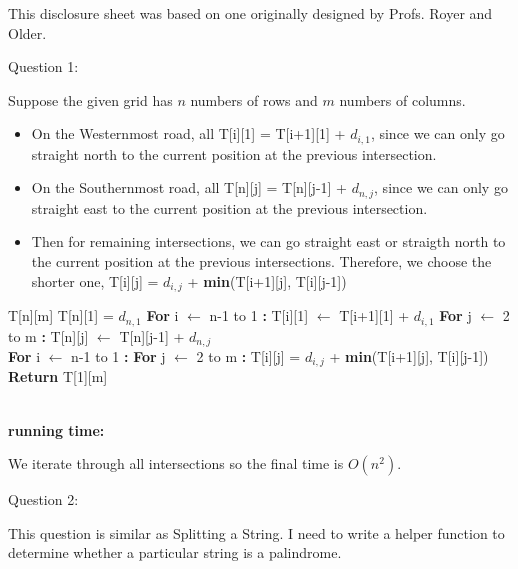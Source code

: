 \documentclass[12pt]{article}
\begin{document}

\hfill {\tiny This disclosure sheet was based on one originally designed
  by
  Profs. Royer and Older.}


\pagebreak
\noindent
\large Question 1: \vspace{5mm} \par
\normalsize 
Suppose the given grid has $n$ numbers of rows and $m$ numbers of columns. 
\begin{itemize}
  \item On the Westernmost road, all T[i][1] = T[i+1][1] + $d_{i,1}$, 
	since we can only go straight north to the current position at the previous intersection.
  \item	On the Southernmost road, all T[n][j] = T[n][j-1] + $d_{n,j}$,
	since we can only go straight east to the current position at the previous intersection.
  \item Then for remaining intersections, we can go straight east or straigth north to the current position at the previous intersections.
	Therefore, we choose the shorter one, T[i][j] = $d_{i,j}$ + \textbf{min}(T[i+1][j], T[i][j-1])
\end{itemize}

\begin{algorithm}
\begin{algorithmic}
\State T[n][m]
\State T[n][1] = $d_{n,1}$
\State \textbf{For} i $\leftarrow$ n-1 to 1 \textbf{:}
\State \hspace{0.4cm} T[i][1] $\leftarrow$ T[i+1][1] + $d_{i,1}$
\State \textbf{For} j $\leftarrow$ 2 to m \textbf{:}
\State \hspace{0.4cm} T[n][j] $\leftarrow$ T[n][j-1] + $d_{n,j}$
\\
\State \textbf{For} i $\leftarrow$ n-1 to 1 \textbf{:}
\State \hspace{0.4cm} \textbf{For} j $\leftarrow$ 2 to m \textbf{:}
\State \hspace{0.8cm} T[i][j] = $d_{i,j}$ + \textbf{min}(T[i+1][j], T[i][j-1])
\\
\State \textbf{Return} T[1][m] 
\end{algorithmic}
\end{algorithm}
\noindent \\
\textbf{running time:} \par
We iterate through all intersections so the final time is $O(n^2)$.



\pagebreak
\noindent
\large Question 2: \vspace{5mm} \par
\normalsize 
This question is similar as Splitting a String.
I need to write a helper function to determine whether a particular string is a palindrome.
\end{document}
